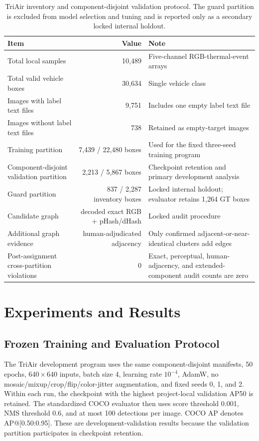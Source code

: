 \begin{table}[t]
\centering
\caption{TriAir inventory and component-disjoint validation protocol. The guard partition is excluded from model selection and tuning and is reported only as a secondary locked internal holdout.}
\label{tab:protocol}
\small
\begin{tabularx}{\textwidth}{@{}l r Y@{}}
\toprule
Item & Value & Note\\
\midrule
Total local samples & 10,489 & Five-channel RGB-thermal-event arrays\\
Total valid vehicle boxes & 30,634 & Single vehicle class\\
Images with label text files & 9,751 & Includes one empty label text file\\
Images without label text files & 738 & Retained as empty-target images\\
Training partition & 7,439 / 22,480 boxes & Used for the fixed three-seed training program\\
Component-disjoint validation partition & 2,213 / 5,867 boxes & Checkpoint retention and primary development analysis\\
Guard partition & 837 / 2,287 inventory boxes & Locked internal holdout; evaluator retains 1,264 GT boxes\\
Candidate graph & decoded exact RGB + pHash/dHash & Locked audit procedure\\
Additional graph evidence & human-adjudicated adjacency & Only confirmed adjacent-or-near-identical clusters add edges\\
Post-assignment cross-partition violations & 0 & Exact, perceptual, human-adjacency, and extended-component audit counts are zero\\
\bottomrule
\end{tabularx}
\end{table}

\section{Experiments and Results}
\subsection{Frozen Training and Evaluation Protocol}
The TriAir development program uses the same component-disjoint manifests, 50 epochs, $640\times640$ inputs, batch size 4, learning rate $10^{-4}$, AdamW, no mosaic/mixup/crop/flip/color-jitter augmentation, and fixed seeds 0, 1, and 2. Within each run, the checkpoint with the highest project-local validation AP50 is retained. The standardized COCO evaluator then uses score threshold 0.001, NMS threshold 0.6, and at most 100 detections per image. COCO AP denotes AP@[0.50:0.95]. These are development-validation results because the validation partition participates in checkpoint retention.

